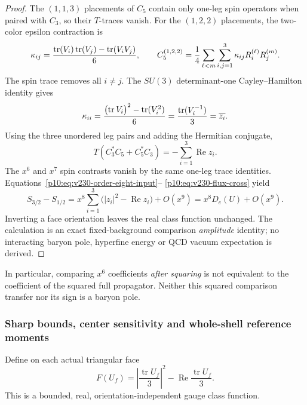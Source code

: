\documentclass[12pt,a4paper]{article}
\begin{document}
\begin{proof}
The $(1,1,3)$ placements of $C_5$ contain only one-leg spin operators
when paired with $C_3$, so their $T$-traces vanish.  For the
$(1,2,2)$ placements, the two-color epsilon contraction is
\[
 \kappa_{ij}={\operatorname{tr}(V_i)\operatorname{tr}(V_j)
                    -\operatorname{tr}(V_iV_j)\over6},\qquad
 C_5^{(1,2,2)}=\frac14\sum_{\ell<m}\sum_{i,j=1}^3
            \kappa_{ij}R_i^{(\ell)}R_j^{(m)}.
\]
The spin trace removes all $i\ne j$.  The $SU(3)$ determinant-one
Cayley--Hamilton identity gives
\[
 \kappa_{ii}={\bigl(\operatorname{tr}V_i\bigr)^2
                       -\operatorname{tr}(V_i^2)\over6}
       ={\operatorname{tr}(V_i^{-1})\over3}=\overline{z_i}.
\]
Using the three unordered leg pairs and adding the Hermitian conjugate,
\begin{equation}\label{p10:eq:v230-flux-cross}
 T(C_3^*C_5+C_5^*C_3)=-\sum_{i=1}^3\operatorname{Re}z_i.
\end{equation}
The $x^6$ and $x^7$ spin contrasts vanish by the same one-leg trace
identities.  Equations~\eqref{p10:eq:v230-order-eight-input}--
\eqref{p10:eq:v230-flux-cross} yield
\[
 S_{3/2}-S_{1/2}
 =x^8\sum_{i=1}^3\bigl(|z_i|^2-\operatorname{Re}z_i\bigr)
   +O(x^9)=x^8D_e(U)+O(x^9).
\]
Inverting a face orientation leaves the real class function unchanged.
The calculation is an exact fixed-background comparison \emph{amplitude}
identity; no interacting baryon pole, hyperfine energy or QCD vacuum
expectation is derived.
\end{proof}

In particular, comparing $x^6$ coefficients \emph{after squaring} is
not equivalent to the coefficient of the squared full propagator.
Neither this squared comparison transfer nor its sign is a baryon pole.


\subsubsection{Sharp bounds, center sensitivity and whole-shell reference moments}
\label{p10:subsec:v2220-global-flux}
Define on each actual triangular face
\begin{equation}
\label{p10:eq:v2220-face-functional}
 F(U_f)=\left|\frac{\operatorname{tr}U_f}{3}\right|^2
       -\operatorname{Re}\frac{\operatorname{tr}U_f}{3}.
\end{equation}
This is a bounded, real, orientation-independent gauge class function.
\end{document}

